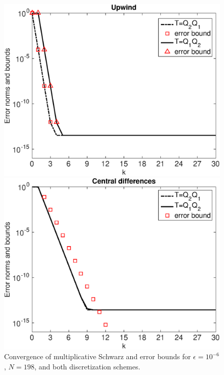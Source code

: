 \begin{figure}[tbhp]
\begin{minipage}[t]{0.49\linewidth}
\includegraphics[width=0.95\linewidth]{figures/mSm_upwind_eps_1e-06_N_198}
\end{minipage}
%
\begin{minipage}[t]{0.49\linewidth}
\includegraphics[width=0.95\linewidth]{figures/mSm_central_eps_1e-06_N_198}
\end{minipage}
\caption{Convergence of multiplicative Schwarz and error bounds for
$\epsilon=10^{-6}$, $N=198$, and both discretization schemes.}
\label{fig:1D:MSM.N198.eps6}
\end{figure}

